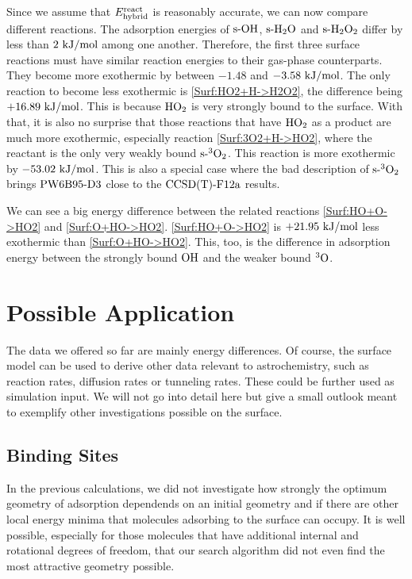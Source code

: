Since we assume that $E^{\text{react}}_{\text{hybrid}}$ is reasonably accurate, we can now compare
different reactions. The adsorption energies of $\text{s-}\text O \text H$, $\text{s-}\text H _2 \text O$ and
$\text{s-}\text H _2 \text O_2$ differ by less than $2~\text {kJ/mol}$ among one another. Therefore,
the first three surface reactions must have similar reaction energies
to their gas-phase counterparts. They become more exothermic by between
$-1.48$ and $-3.58~\text {kJ/mol}$. The only reaction to become less exothermic
is \eqref{Surf:HO2+H->H2O2}, the difference being $+16.89~\text {kJ/mol}$. This
is because $\text H \text O_2$ is very strongly
bound to the surface. With that, it is also no surprise that those
reactions that have $\text H \text O_2$ as a product are much more exothermic, especially
reaction \eqref{Surf:3O2+H->HO2}, where the reactant is the only
very weakly bound $\text{s-}{^3\ensuremath{\text O_2}}$. This reaction is more exothermic
by $-53.02~\text {kJ/mol}$. This is also a special case where the bad description
of $\text{s-}{^3\ensuremath{\text O_2}}$ brings $\text{PW6B95}\text{-D3}$ close to the $\text{CCSD(T)-F12a}$ results.

We can see a big energy difference between the related reactions
\eqref{Surf:HO+O->HO2} and \eqref{Surf:O+HO->HO2}. \eqref{Surf:HO+O->HO2}
is $+21.95~\text {kJ/mol}$ less exothermic than \eqref{Surf:O+HO->HO2}. This, too,
is the difference in adsorption energy between the strongly bound $\text O \text H$
and the weaker bound ${^3\text{O}}$.

\section{Possible Application}

The data we offered so far are mainly energy differences. Of course, the
surface model can be used to derive other data relevant to astrochemistry,
such as reaction rates, diffusion rates or tunneling rates. These could be
further used as simulation input. We will not go into detail here but give a small
outlook meant to exemplify other investigations possible on the surface. 

\subsection{Binding Sites}
\newcommand\rmax{\enmat{r_{\te{max}}}}
\newcommand\rmin{\enmat{r_{\te{min}}}}
\label{Sec:Adv:Binding}


In the previous calculations, we did not investigate how strongly the optimum
geometry of adsorption dependends on an initial geometry and if there
are other local energy minima that molecules adsorbing to the surface can occupy.
It is well possible, especially for those molecules that have additional
internal and rotational degrees of freedom, that our search
algorithm did not even find the most attractive geometry possible.

